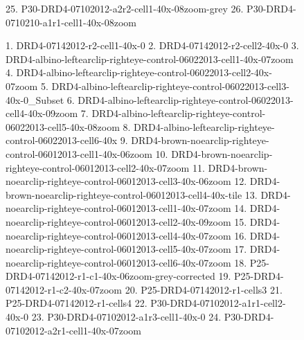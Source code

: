 \documentclass{article}
\begin{document}
\begin{figure}
  \centering
  \caption{1. DRD4-07142012-r2-cell1-40x-0
2. DRD4-07142012-r2-cell2-40x-0
3. DRD4-albino-leftearclip-righteye-control-06022013-cell1-40x-07zoom
4. DRD4-albino-leftearclip-righteye-control-06022013-cell2-40x-07zoom
5. DRD4-albino-leftearclip-righteye-control-06022013-cell3-40x-0_Subset
6. DRD4-albino-leftearclip-righteye-control-06022013-cell4-40x-09zoom
7. DRD4-albino-leftearclip-righteye-control-06022013-cell5-40x-08zoom
8. DRD4-albino-leftearclip-righteye-control-06022013-cell6-40x
9. DRD4-brown-noearclip-righteye-control-06012013-cell1-40x-06zoom
10. DRD4-brown-noearclip-righteye-control-06012013-cell2-40x-07zoom
11. DRD4-brown-noearclip-righteye-control-06012013-cell3-40x-06zoom
12. DRD4-brown-noearclip-righteye-control-06012013-cell4-40x-tile
13. DRD4-noearclip-righteye-control-06012013-cell1-40x-07zoom
14. DRD4-noearclip-righteye-control-06012013-cell2-40x-09zoom
15. DRD4-noearclip-righteye-control-06012013-cell4-40x-07zoom
16. DRD4-noearclip-righteye-control-06012013-cell5-40x-07zoom
17. DRD4-noearclip-righteye-control-06012013-cell6-40x-07zoom
18. P25-DRD4-07142012-r1-c1-40x-06zoom-grey-corrected
19. P25-DRD4-07142012-r1-c2-40x-07zoom
20. P25-DRD4-07142012-r1-cells3
21. P25-DRD4-07142012-r1-cells4
22. P30-DRD4-07102012-a1r1-cell2-40x-0
23. P30-DRD4-07102012-a1r3-cell1-40x-0
24. P30-DRD4-07102012-a2r1-cell1-40x-07zoom}
25. P30-DRD4-07102012-a2r2-cell1-40x-08zoom-grey
26. P30-DRD4-0710210-a1r1-cell1-40x-08zoom
\end{figure}
\end{document}
